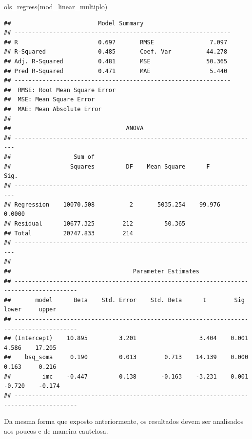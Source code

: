 \documentclass[
]{book}
\newenvironment{Shaded}{\begin{snugshade}}{\end{snugshade}}
\newcommand{\FunctionTok}[1]{\textcolor[rgb]{0.00,0.00,0.00}{#1}}
\newcommand{\NormalTok}[1]{#1}
\begin{document}
\begin{Shaded}
\begin{Highlighting}[]
\FunctionTok{ols\_regress}\NormalTok{(mod\_linear\_multiplo)}
\end{Highlighting}
\end{Shaded}

\begin{verbatim}
##                         Model Summary                          
## --------------------------------------------------------------
## R                       0.697       RMSE                7.097 
## R-Squared               0.485       Coef. Var          44.278 
## Adj. R-Squared          0.481       MSE                50.365 
## Pred R-Squared          0.471       MAE                 5.440 
## --------------------------------------------------------------
##  RMSE: Root Mean Square Error 
##  MSE: Mean Square Error 
##  MAE: Mean Absolute Error 
## 
##                                 ANOVA                                  
## ----------------------------------------------------------------------
##                  Sum of                                               
##                 Squares         DF    Mean Square      F         Sig. 
## ----------------------------------------------------------------------
## Regression    10070.508          2       5035.254    99.976    0.0000 
## Residual      10677.325        212         50.365                     
## Total         20747.833        214                                    
## ----------------------------------------------------------------------
## 
##                                   Parameter Estimates                                    
## ----------------------------------------------------------------------------------------
##       model      Beta    Std. Error    Std. Beta      t        Sig      lower     upper 
## ----------------------------------------------------------------------------------------
## (Intercept)    10.895         3.201                  3.404    0.001     4.586    17.205 
##    bsq_soma     0.190         0.013        0.713    14.139    0.000     0.163     0.216 
##         imc    -0.447         0.138       -0.163    -3.231    0.001    -0.720    -0.174 
## ----------------------------------------------------------------------------------------
\end{verbatim}

Da mesma forma que exposto anteriormente, os resultados devem ser analisados aos poucos e de maneira cautelosa.
\end{document}
